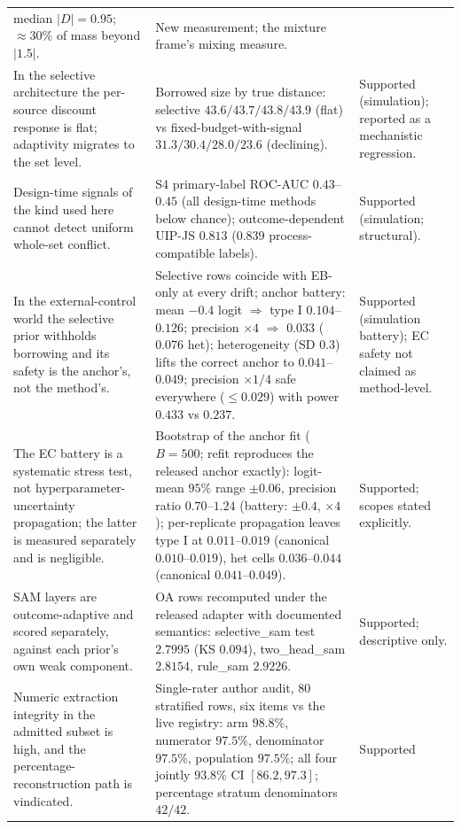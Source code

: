 \documentclass[11pt]{article}
\begin{document}
\begin{longtable}{p{} p{} p{}}
median $|D| = 0.95$; $\approx 30\%$ of mass beyond $|1.5|$. & New
measurement; the mixture frame's mixing measure. \\
In the selective architecture the per-source discount response is flat;
adaptivity migrates to the set level. & Borrowed size by true distance:
selective $43.6/43.7/43.8/43.9$ (flat) vs fixed-budget-with-signal
$31.3/30.4/28.0/23.6$ (declining). & Supported (simulation); reported as a
mechanistic regression. \\
Design-time signals of the kind used here cannot detect uniform whole-set
conflict. & S4 primary-label ROC-AUC $0.43$--$0.45$ (all design-time methods
below chance); outcome-dependent UIP-JS $0.813$ ($0.839$ process-compatible
labels). & Supported (simulation; structural). \\
In the external-control world the selective prior withholds borrowing and
its safety is the anchor's, not the method's. & Selective rows coincide with
EB-only at every drift; anchor battery: mean $-0.4$ logit $\Rightarrow$
type I $0.104$--$0.126$; precision $\times4$ $\Rightarrow$ $0.033$
($0.076$ het); heterogeneity (SD $0.3$) lifts the correct anchor to
$0.041$--$0.049$; precision $\times1/4$ safe everywhere ($\le0.029$) with
power $0.433$ vs $0.237$. & Supported (simulation battery); EC safety not
claimed as method-level. \\
The EC battery is a systematic stress test, not hyperparameter-uncertainty
propagation; the latter is measured separately and is negligible. &
Bootstrap of the anchor fit ($B=500$; refit reproduces the released anchor
exactly): logit-mean $95\%$ range $\pm 0.06$, precision ratio
$0.70$--$1.24$ (battery: $\pm 0.4$, $\times 4$); per-replicate propagation
leaves type I at $0.011$--$0.019$ (canonical $0.010$--$0.019$), het cells
$0.036$--$0.044$ (canonical $0.041$--$0.049$). & Supported; scopes stated
explicitly. \\
SAM layers are outcome-adaptive and scored separately, against each prior's
own weak component. & OA rows recomputed under the released adapter with
documented semantics: selective\_sam test $2.7995$ (KS $0.094$), two\_head\_sam
$2.8154$, rule\_sam $2.9226$. & Supported; descriptive only. \\
Numeric extraction integrity in the admitted subset is high, and the
percentage-reconstruction path is vindicated. & Single-rater author audit, 80 stratified
rows, six items vs the live registry: arm $98.8\%$, numerator $97.5\%$,
denominator $97.5\%$, population $97.5\%$; all four jointly $93.8\%$ CI
$[86.2,97.3]$; percentage stratum denominators $42/42$. & Supported

\end{longtable}
\end{document}
